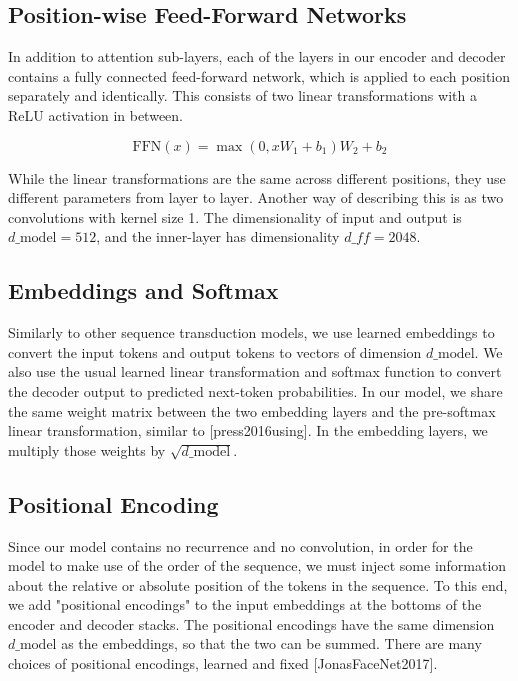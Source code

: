 \documentclass[11pt,a4paper]{article}
\begin{document}
\subsection{Position-wise Feed-Forward Networks}

In addition to attention sub-layers, each of the layers in our encoder and decoder contains a fully connected feed-forward network, which is applied to each position separately and identically.  This consists of two linear transformations with a ReLU activation in between.

$$\mathrm{FFN}(x)=\max(0, xW_1 + b_1) W_2 + b_2$$

While the linear transformations are the same across different positions, they use different parameters from layer to layer. Another way of describing this is as two convolutions with kernel size 1.  The dimensionality of input and output is $d\_{\text{model}}=512$, and the inner-layer has dimensionality $d\_{ff}=2048$.

\subsection{Embeddings and Softmax}

Similarly to other sequence transduction models, we use learned embeddings to convert the input tokens and output tokens to vectors of dimension $d\_{\text{model}}$.  We also use the usual learned linear transformation and softmax function to convert the decoder output to predicted next-token probabilities.  In our model, we share the same weight matrix between the two embedding layers and the pre-softmax linear transformation, similar to [press2016using].   In the embedding layers, we multiply those weights by $\sqrt{d\_{\text{model}}}$.

\subsection{Positional Encoding}

Since our model contains no recurrence and no convolution, in order for the model to make use of the order of the sequence, we must inject some information about the relative or absolute position of the tokens in the sequence.  To this end, we add "positional encodings" to the input embeddings at the bottoms of the encoder and decoder stacks.  The positional encodings have the same dimension $d\_{\text{model}}$ as the embeddings, so that the two can be summed.   There are many choices of positional encodings, learned and fixed [JonasFaceNet2017].
\end{document}
